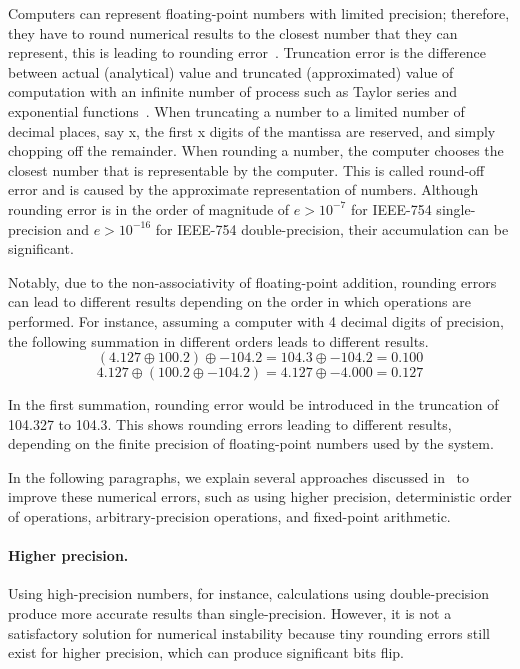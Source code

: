Computers can represent floating-point numbers with limited precision; therefore,
they have to round numerical results to the closest number that they can represent,
this is leading to rounding  error~\cite{fadnavis1998some}. 
Truncation error is the difference between actual (analytical) value and
truncated (approximated) value of computation with an infinite number of process
such as Taylor series and exponential functions~\cite{kiusalaas2013numerical}.
When truncating a number to a limited number of decimal places, say x, the first x digits
of the mantissa are reserved, and simply chopping off the remainder.
When rounding a number, the computer chooses the closest number that is representable by
the computer. This is called round-off error and is caused by the approximate representation of numbers.
Although rounding error is in the order of magnitude of $e>10^{-7}$ for IEEE-754 single-precision
and $e>10^{-16}$ for IEEE-754 double-precision, their accumulation can be significant. 

Notably, due to the non-associativity of floating-point addition, 
rounding errors can lead to different results depending on the order in 
which operations are performed. For instance, assuming 
a computer with 4 decimal digits of precision, the following summation 
in different orders leads to different results.
\[
(4.127 \oplus 100.2) \oplus -104.2 = 104.3 \oplus -104.2 = 0.100
\]
\[
4.127 \oplus (100.2 \oplus -104.2) = 4.127 \oplus -4.000 = 0.127
\]

In the first summation, rounding error would be introduced in the truncation of 104.327 to 104.3.
This shows rounding errors leading to different results, depending on the finite precision of floating-point numbers used by the system.

In the following paragraphs, we explain several approaches discussed in~\cite{muller2018reproducible}
to improve these numerical errors, such as using higher precision, deterministic order of operations,
arbitrary-precision operations, and fixed-point arithmetic.

\paragraph{Higher precision.} Using high-precision numbers, for instance,
calculations using double-precision produce more accurate results than single-precision.
However, it is not a satisfactory solution for numerical instability
because tiny rounding errors still exist for higher precision, which can produce significant bits flip.

